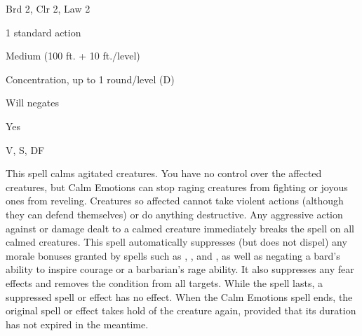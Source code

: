 
\begin{description*}
\item[Level:] Brd 2, Clr 2, Law 2
\item[Casting Time:] 1 standard action
\item[Range:] Medium (100 ft. + 10 ft./level)
\item[Duration:] Concentration, up to 1 round/level (D)
\item[Saving Throw:] Will negates
\item[Spell Resistance:] Yes
\item[Components:] V, S, DF
\end{description*}

This spell calms agitated creatures. You have no control over the affected creatures,
but Calm Emotions can stop raging creatures from fighting or joyous ones
from reveling. Creatures so affected cannot take violent actions (although they
can defend themselves) or do anything destructive. Any aggressive action against
or damage dealt to a calmed creature immediately breaks the spell on all calmed
creatures.
This spell automatically suppresses (but does not dispel) any morale bonuses granted
by spells such as , , and , as well as negating
a bard's ability to inspire courage or a barbarian's rage ability. It also suppresses
any fear effects and removes the  condition from all targets.
While the spell lasts, a suppressed spell or effect has no effect. When the Calm
Emotions spell ends, the original spell or effect takes hold of the creature again,
provided that its duration has not expired in the meantime.